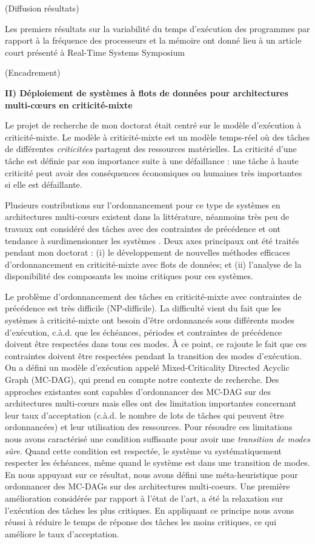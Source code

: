 \documentclass{article}
\begin{document}
(Diffusion résultats)

Les premiers résultats sur la variabilité du temps d'exécution  des programmes par rapport à la fréquence 
des processeurs et la mémoire ont donné lieu à un article court présenté à Real-Time Systems Symposium

(Encadrement)
\vspace{.5cm}

\textbf{II) Déploiement de systèmes à flots de données pour architectures multi-c\oe{}urs en criticité-mixte}
\vspace{.5cm}

Le projet de recherche de mon doctorat était centré sur le modèle d'exécution à criticité-mixte. Le modèle à 
criticité-mixte est un modèle temps-réel où des tâches de différentes \textit{criticitées} partagent des 
ressources matérielles. La criticité d'une tâche est définie par son importance suite à une défaillance : une 
tâche à haute criticité peut avoir des conséquences économiques ou humaines très importantes si elle est 
défaillante.

Plusieurs contributions sur l'ordonnancement pour ce type de systèmes en architectures  multi-c\oe{}urs 
existent dans la littérature, néanmoins très peu de travaux ont considéré des tâches avec des contraintes de 
précédence et ont tendance à surdimensionner les systèmes . Deux axes principaux ont été traités pendant 
mon doctorat : (i) le développement de nouvelles méthodes efficaces d'ordonnancement en criticité-mixte 
avec flots de données; et (ii) l'analyse de la disponibilité des composants les moins critiques pour ces 
systèmes.

Le problème d'ordonnancement des tâches en criticité-mixte avec contraintes de précédence est très 
difficile (NP-difficile). La difficulté vient du fait que les systèmes à criticité-mixte ont besoin d'être 
ordonnancés sous différents modes d'exécution, c.à.d. que les échéances, périodes et contraintes de 
précédence doivent être respectées dans tous ces modes. À ce point, ce rajoute le fait que ces contraintes 
doivent être respectées pendant la transition des modes d'exécution. On a défini un modèle d'exécution 
appelé Mixed-Criticality Directed Acyclic Graph (MC-DAG), qui prend en compte notre contexte de 
recherche. Des approches existantes sont capables d'ordonnancer des MC-DAG sur des architectures 
multi-c\oe{}urs  mais elles ont des limitation importantes concernant leur taux d'acceptation (c.à.d. le 
nombre de lots de tâches qui peuvent être ordonnancées) et leur utilisation des ressources. Pour résoudre 
ces limitations nous avons caractérisé une condition suffisante pour avoir une \textit{transition de modes 
sûre}. Quand cette condition est respectée, le système va systématiquement respecter les échéances, même 
quand le système est dans une transition de modes. En nous appuyant sur ce résultat, nous avons défini une 
méta-heuristique pour ordonnancer des MC-DAGs sur des architectures multi-coeurs. Une première 
amélioration considérée par rapport à l'état de l'art, a été la relaxation sur l'exécution des tâches les plus 
critiques. En appliquant ce principe nous avons réussi à réduire le temps de réponse des tâches les moins 
critiques, ce qui améliore le taux d'acceptation.
\end{document}
